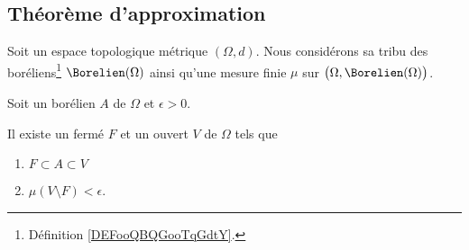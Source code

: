 \subsection{Théorème d'approximation}

\begin{lemma}       \label{LEMooCGKXooYWjRwk}
    Soit un espace topologique métrique \( (\Omega,d)\). Nous considérons sa tribu des boréliens\footnote{Définition \ref{DEFooQBQGooTqGdtY}.} \( \Borelien(\Omega)\) ainsi qu'une mesure finie \( \mu\) sur \( \big(\Omega,\Borelien(\Omega)\big)\). 

    Soit un borélien \( A\) de \( \Omega\) et \( \epsilon>0\). 

    Il existe un fermé \( F\) et un ouvert \( V\) de \( \Omega\) tels que
    \begin{enumerate}
        \item
            \( F\subset A\subset V\)
        \item
            \( \mu(V\setminus F)<\epsilon\).
    \end{enumerate}
\end{lemma}

